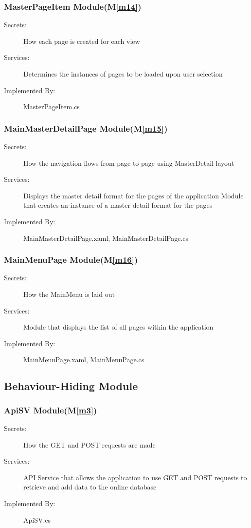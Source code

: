 \documentclass[12pt, titlepage]{article}
\newcommand{\mref}[1]{M\ref{#1}}
\begin{document}
\subsubsection{MasterPageItem Module(\mref{m14})}
\begin{description}
\item[Secrets:]How each page is created for each view
\item[Services:]Determines the instances of pages to be loaded upon user selection
\item[Implemented By:] MasterPageItem.cs
\end{description}

\subsubsection{MainMasterDetailPage Module(\mref{m15})}
\begin{description}
\item[Secrets:]How the navigation flows from page to page using MasterDetail layout
\item[Services:]Displays the master detail format for the pages of the application
Module that creates an instance of a master detail format for the pages
\item[Implemented By:]  MainMasterDetailPage.xaml, MainMasterDetailPage.cs
\end{description}

\subsubsection{MainMenuPage Module(\mref{m16})}
\begin{description}
\item[Secrets:]How the MainMenu is laid out
\item[Services:]Module that displays the list of all pages within the application
\item[Implemented By:] MainMenuPage.xaml, MainMenuPage.cs
\end{description}

\subsection{Behaviour-Hiding Module}
\subsubsection{ApiSV Module(\mref{m3})}
\begin{description}
\item[Secrets:] How the GET and POST requests are made
\item[Services:] API Service that allows the application to use GET and POST requests to retrieve and add data to the online database
\item[Implemented By:] ApiSV.cs
\end{description}
\end{document}
